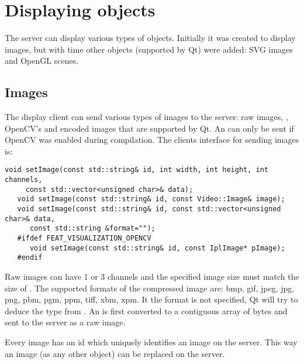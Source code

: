 \section{Displaying objects}

The server can display various types of objects. Initially it was created to
display images, but with time other objects (supported by Qt) were added:
SVG images and OpenGL scenes.

\subsection{Images}

The display client can send various types of images to the server: raw images, 
, OpenCV's  and encoded images that are
supported by Qt. An  can only be sent if OpenCV was enabled
during compilation.
The clients interface for sending images is:

\begin{Verbatim}[fontsize=\scriptsize,gobble=3]
   void setImage(const std::string& id, int width, int height, int channels,
     const std::vector<unsigned char>& data);
   void setImage(const std::string& id, const Video::Image& image); 
   void setImage(const std::string& id, const std::vector<unsigned char>& data,
      const std::string &format=""); 
   #ifdef FEAT_VISUALIZATION_OPENCV
      void setImage(const std::string& id, const IplImage* pImage); 
   #endif
\end{Verbatim}

Raw images can have 1 or 3 channels and the specified image size must match the
size of . The supported formats of the compressed image are: bmp,
gif, jpeg, jpg, png, pbm, pgm, ppm, tiff, xbm, xpm. It the format is not
specified, Qt will try to deduce the type from . An 
is first converted to a contiguous array of bytes and sent to the server as a
raw image.
 
Every image has an id which uniquely identifies an image on the server. This way
an image (as any other object) can be replaced on the server.
